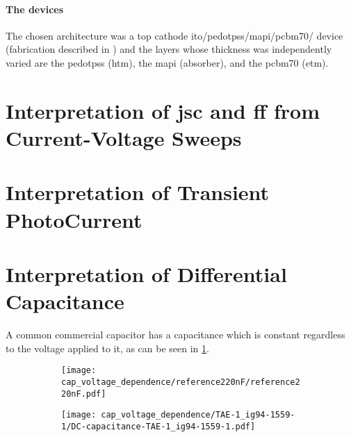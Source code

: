 	\paragraph{The devices} The chosen architecture was a top cathode \gls{ito}/\gls{pedotpss}/\gls{mapi}/\gls{pcbm70}/ device (fabrication described in ) and the layers whose thickness was independently varied are the \gls{pedotpss} (\gls{htm}), the \gls{mapi} (absorber), and the \gls{pcbm70} (\gls{etm}).

\section{Interpretation of \gls{jsc} and \gls{ff} from Current-Voltage Sweeps}

\section{Interpretation of Transient PhotoCurrent}\label{interpretation_tpc}

\section{Interpretation of Differential Capacitance}\label{interpretation_dc}

	A common commercial capacitor has a capacitance which is constant regardless to the voltage applied to it, as can be seen in \cref{fig:cap_voltage_dependence_commercial}.

	\begin{figure}%
		\centering
		\begin{subfigure}[t]{0.45\textwidth}
			\texttt{[image: cap\_voltage\_dependence/reference220nF/reference220nF.pdf]}
			\label{fig:cap_voltage_dependence_commercial}
		\end{subfigure}
		\qquad
		\begin{subfigure}[t]{0.45\textwidth}
			\texttt{[image: cap\_voltage\_dependence/TAE-1\_ig94-1559-1/DC-capacitance-TAE-1\_ig94-1559-1.pdf]}
			\label{fig:cap_voltage_dependence_tae1}
		\end{subfigure}
		\label{fig:cap_voltage_dependence}
	\end{figure}

